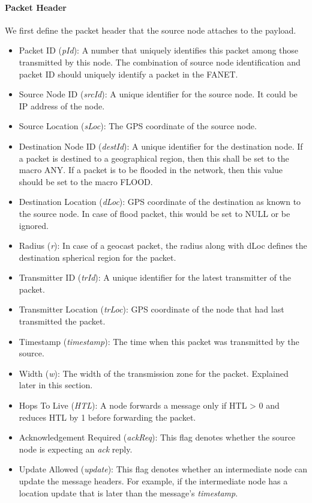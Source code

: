 \paragraph{Packet Header} \label{packet_header}
We first define the packet header that the source node attaches to the payload.
\begin{itemize}
\item Packet ID (\emph{pId}): A number that uniquely identifies this packet among those transmitted by this node. The combination of source node identification and packet ID should uniquely identify a packet in the FANET. 
\item Source Node ID (\emph{srcId}): A unique identifier for the source node. It could be IP address of the node.
\item Source Location (\emph{sLoc}): The GPS coordinate of the source node.
\item Destination Node ID (\emph{destId}): A unique identifier for the destination node. If a packet is destined to a geographical region, then this shall be set to the macro ANY. If a packet is to be flooded in the network, then this value should be set to the macro FLOOD. 
\item Destination Location (\emph{dLoc}): GPS coordinate of the destination as known to the source node. In case of flood packet, this would be set to NULL or be ignored. 
\item Radius (\emph{r}): In case of a geocast packet, the radius along with dLoc defines the destination spherical region for the packet.
\item Transmitter ID (\emph{trId}): A unique identifier for the latest transmitter of the packet.
\item Transmitter Location (\emph{trLoc}): GPS coordinate of the node that had last transmitted the packet.
\item Timestamp (\emph{timestamp}): The time when this packet was transmitted by the source.
\item Width (\emph{w}): The width of the transmission zone for the packet. Explained later in this section.
\item Hops To Live (\emph{HTL}): A node forwards a message only if HTL > 0 and reduces HTL by 1 before forwarding the packet. 
\item Acknowledgement Required (\emph{ackReq}): This flag denotes whether the source node is expecting an \emph{ack} reply.
\item Update Allowed (\emph{update}): This flag denotes whether an intermediate node can update the message headers. For example, if the intermediate node has a location update that is later than the message's \emph{timestamp}.

\end{itemize}

